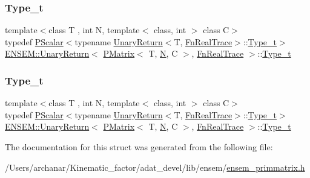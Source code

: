 \subsubsection{\texorpdfstring{Type\_t}{Type\_t}\hspace{0.1cm}{\footnotesize\ttfamily [1/2]}}
{\footnotesize\ttfamily template$<$class T , int N, template$<$ class, int $>$ class C$>$ \\
typedef \mbox{\hyperlink{classENSEM_1_1PScalar}{P\+Scalar}}$<$typename \mbox{\hyperlink{structENSEM_1_1UnaryReturn}{Unary\+Return}}$<$T, \mbox{\hyperlink{structENSEM_1_1FnRealTrace}{Fn\+Real\+Trace}}$>$\+::\mbox{\hyperlink{structENSEM_1_1UnaryReturn_3_01PMatrix_3_01T_00_01N_00_01C_01_4_00_01FnRealTrace_01_4_a22a5a3f850fb258f3825c3a6f84a3259}{Type\+\_\+t}}$>$ \mbox{\hyperlink{structENSEM_1_1UnaryReturn}{E\+N\+S\+E\+M\+::\+Unary\+Return}}$<$ \mbox{\hyperlink{classENSEM_1_1PMatrix}{P\+Matrix}}$<$ T, \mbox{\hyperlink{operator__name__util_8cc_a7722c8ecbb62d99aee7ce68b1752f337}{N}}, C $>$, \mbox{\hyperlink{structENSEM_1_1FnRealTrace}{Fn\+Real\+Trace}} $>$\+::\mbox{\hyperlink{structENSEM_1_1UnaryReturn_3_01PMatrix_3_01T_00_01N_00_01C_01_4_00_01FnRealTrace_01_4_a22a5a3f850fb258f3825c3a6f84a3259}{Type\+\_\+t}}}

\mbox{\label{structENSEM_1_1UnaryReturn_3_01PMatrix_3_01T_00_01N_00_01C_01_4_00_01FnRealTrace_01_4_a22a5a3f850fb258f3825c3a6f84a3259}} 
\subsubsection{\texorpdfstring{Type\_t}{Type\_t}\hspace{0.1cm}{\footnotesize\ttfamily [2/2]}}
{\footnotesize\ttfamily template$<$class T , int N, template$<$ class, int $>$ class C$>$ \\
typedef \mbox{\hyperlink{classENSEM_1_1PScalar}{P\+Scalar}}$<$typename \mbox{\hyperlink{structENSEM_1_1UnaryReturn}{Unary\+Return}}$<$T, \mbox{\hyperlink{structENSEM_1_1FnRealTrace}{Fn\+Real\+Trace}}$>$\+::\mbox{\hyperlink{structENSEM_1_1UnaryReturn_3_01PMatrix_3_01T_00_01N_00_01C_01_4_00_01FnRealTrace_01_4_a22a5a3f850fb258f3825c3a6f84a3259}{Type\+\_\+t}}$>$ \mbox{\hyperlink{structENSEM_1_1UnaryReturn}{E\+N\+S\+E\+M\+::\+Unary\+Return}}$<$ \mbox{\hyperlink{classENSEM_1_1PMatrix}{P\+Matrix}}$<$ T, \mbox{\hyperlink{operator__name__util_8cc_a7722c8ecbb62d99aee7ce68b1752f337}{N}}, C $>$, \mbox{\hyperlink{structENSEM_1_1FnRealTrace}{Fn\+Real\+Trace}} $>$\+::\mbox{\hyperlink{structENSEM_1_1UnaryReturn_3_01PMatrix_3_01T_00_01N_00_01C_01_4_00_01FnRealTrace_01_4_a22a5a3f850fb258f3825c3a6f84a3259}{Type\+\_\+t}}}



The documentation for this struct was generated from the following file\+:\begin{DoxyCompactItemize}
\item 
/\+Users/archanar/\+Kinematic\+\_\+factor/adat\+\_\+devel/lib/ensem/\mbox{\hyperlink{lib_2ensem_2ensem__primmatrix_8h}{ensem\+\_\+primmatrix.\+h}}\end{DoxyCompactItemize}
